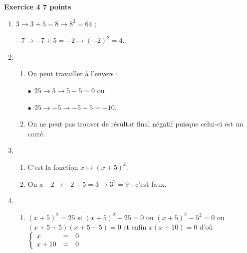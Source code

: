 \textbf{Exercice 4 \hfill 7 points}

\medskip
 
%

\begin{enumerate}
\item %
$3 \to 3 + 5 = 8 \to 8^2 = 64$ ;

$- 7 \to -7 + 5 = - 2 \to (- 2)^2 = 4$. 
\item 
	\begin{enumerate}
		\item %
On peut travailler à l'envers :
		
$\bullet~~$$25 \to 5 \to 5 - 5 = 0$  ou

$\bullet~~$$25 \to - 5 \to -5 - 5 = - 10$. 
		\item %
On ne peut pas trouver de résultat final négatif puisque celui-ci est un carré.
	\end{enumerate} 
\item %
	\begin{enumerate}
		\item %

C'est la fonction $	x \longmapsto (x + 5)^2$.	 
		\item %
On a $- 2 \to - 2 + 5 = 3 \to 3^2 = 9$ : c'est faux. 
	\end{enumerate}		
\item
	\begin{enumerate}
		\item %
$(x + 5)^2 = 25$ si $(x + 5)^2 - 25 = 0$  ou $(x + 5)^2  - 5^2 = 0$ ou $(x + 5 + 5)(x + 5 - 5) = 0$ et enfin $x(x + 10) = 0$ d'où 
$\left\{\begin{array}{l c l}
x	&=&0\\
x+10&=&0\\
\end{array}\right.$


\end{enumerate}
\end{enumerate}

